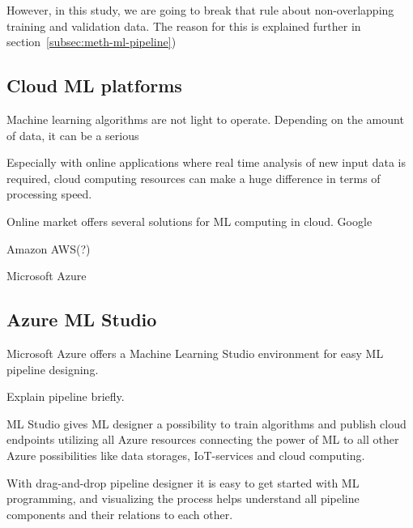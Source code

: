 However, in this study,
we are going to break that rule
about non-overlapping training and validation data.
The reason for this is explained further in section~\ref{subsec:meth-ml-pipeline})


\subsection{Cloud ML platforms}\label{subsec:bg-cloud-ml-platforms}

Machine learning algorithms are not light to operate.
Depending on the amount of data,
it can be a serious %

Especially with online applications
where real time analysis of new input data is required,
cloud computing resources can make a huge difference
in terms of processing speed. %

Online market offers several solutions for ML computing in cloud.
Google

Amazon AWS(?)

Microsoft Azure\cite{altexsoft}


\subsection{Azure ML Studio}\label{subsec:bg-azure-ml-studio-algorithms}

Microsoft Azure offers a Machine Learning Studio environment
for easy ML pipeline designing.

Explain pipeline briefly.

ML Studio gives ML designer a possibility to
train algorithms and publish cloud endpoints
utilizing all Azure resources
connecting the power of ML
to all other Azure possibilities
like data storages, IoT-services and cloud computing.

With drag-and-drop pipeline designer
it is easy to get started with ML programming,
and visualizing the process helps understand all pipeline components
and their relations to each other.

